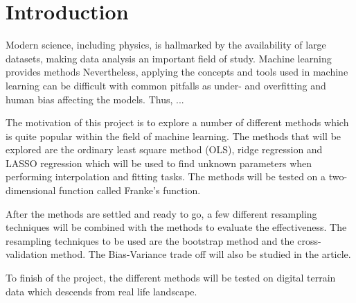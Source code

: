 \documentclass[../main.tex]{subfiles}
\begin{document}
\section{Introduction}\label{sec:introduction}
Modern science, including physics, is hallmarked by the availability of large datasets, making data analysis an important field of study. Machine learning provides methods 
Nevertheless, applying the concepts and tools used in machine learning can be difficult with common pitfalls as under- and overfitting and human bias affecting the models. Thus, ... 

The motivation of this project is to explore a number of different methods which is quite popular within the field of machine learning. The methods that will be explored are the ordinary least square method (OLS), ridge regression and LASSO regression which will be used to find unknown parameters when performing interpolation and fitting tasks. The methods will be tested on a two-dimensional function called Franke’s function.

After the methods are settled and ready to go, a few different resampling techniques will be combined with the methods to evaluate the effectiveness. The resampling techniques to be used are the bootstrap method and the cross-validation method. The Bias-Variance trade off will also be studied in the article.

To finish of the project, the different methods will be tested on digital terrain data which descends from real life landscape.
\end{document}
